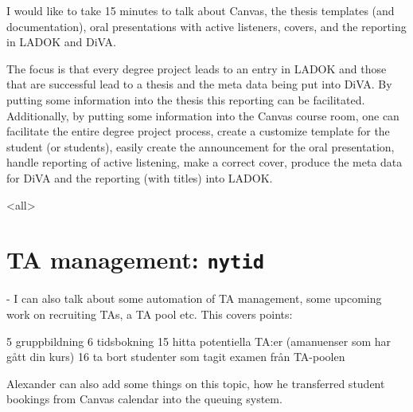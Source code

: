 I would like to take 15 minutes to talk about Canvas, the thesis templates      
(and documentation), oral presentations with active listeners, covers, and      
the reporting in LADOK and DiVA.                                                
                                                                                
The focus is that every degree project leads to an entry in LADOK and those     
that are successful lead to a thesis and the meta data being put into DiVA.     
By putting some information into the thesis this reporting can be               
facilitated. Additionally, by putting some information into the Canvas          
course room, one can facilitate the entire degree project process, create a     
customize template for the student (or students), easily create the             
announcement for the oral presentation, handle reporting of active              
listening, make a correct cover, produce the meta data for DiVA and the         
reporting (with titles) into LADOK.

\mode<all>{}



\section[TA management]{TA management: \texttt{nytid}}

- I can also talk about some automation of TA management, some upcoming
work on recruiting TAs, a TA pool etc. This covers points:

5 gruppbildning
6 tidsbokning
15 hitta potentiella TA:er (amanuenser som har gått din kurs)
16 ta bort studenter som tagit examen från TA-poolen


Alexander can also add some things on this topic, how he transferred
student bookings from Canvas calendar into the queuing system.

